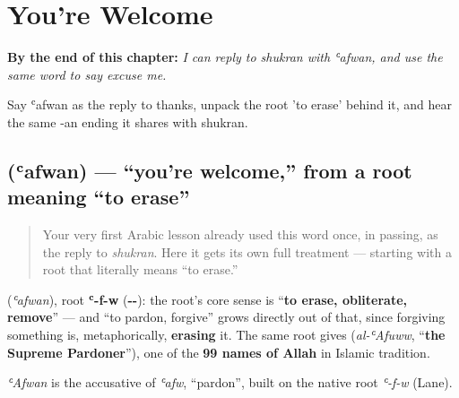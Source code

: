 
\chapter{You're Welcome}
\label{ch:ar-youre-welcome}

\begin{chapteropening}
\textbf{By the end of this chapter:} \emph{I can reply to shukran with ʿafwan, and use the same word to say excuse me.}

Say ʿafwan as the reply to thanks, unpack the root 'to erase' behind it, and hear the same -an ending it shares with shukran.
\end{chapteropening}

\section[\texorpdfstring{\ar{عفوا} (ʿafwan)}{عفوا (ʿafwan)}]{ (ʿafwan) — \textquotedblleft{}you're welcome,\textquotedblright{} from a root meaning \textquotedblleft{}to erase\textquotedblright{}}

\label{lesson:AR-C23-afwan}



\begin{quote}
Your very first Arabic lesson already used this word once, in passing, as the reply to \emph{shukran}. Here it gets its own full treatment — starting with a root that literally means \textquotedblleft{}to erase.\textquotedblright{}
\end{quote}

\begin{cousinweb}
\textbf{} (\emph{ʿafwan}), root \textbf{ʿ-f-w} (\textbf{--}): the root's core sense is \textquotedblleft{}\textbf{to erase, obliterate, remove}\textquotedblright{} — and \textquotedblleft{}to pardon, forgive\textquotedblright{} grows directly out of that, since forgiving something is, metaphorically, \textbf{erasing} it. The same root gives \textbf{} (\emph{al-ʿAfuww}, \textquotedblleft{}\textbf{the Supreme Pardoner}\textquotedblright{}), one of the \textbf{99 names of Allah} in Islamic tradition.

\emph{ʿAfwan} is the accusative of \emph{ʿafw}, \textquotedblleft{}pardon\textquotedblright{}, built on the native root \emph{ʿ-f-w} (Lane).
\end{cousinweb}

